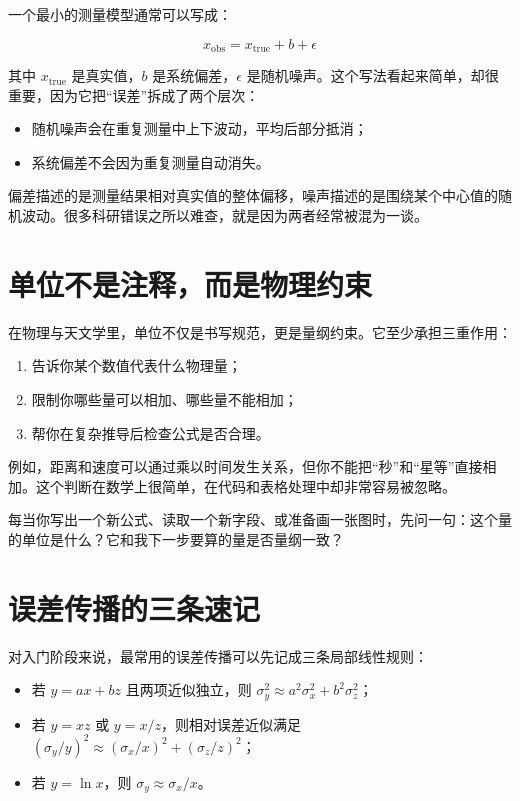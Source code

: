 一个最小的测量模型通常可以写成：

\[
x_{\mathrm{obs}} = x_{\mathrm{true}} + b + \epsilon
\]

其中 $x_{\mathrm{true}}$ 是真实值，$b$ 是系统偏差，$\epsilon$ 是随机噪声。这个写法看起来简单，却很重要，因为它把“误差”拆成了两个层次：

\begin{itemize}
    \item 随机噪声会在重复测量中上下波动，平均后部分抵消；
    \item 系统偏差不会因为重复测量自动消失。
\end{itemize}

\begin{defbox}[偏差与噪声]
偏差描述的是测量结果相对真实值的整体偏移，噪声描述的是围绕某个中心值的随机波动。很多科研错误之所以难查，就是因为两者经常被混为一谈。
\end{defbox}

\section{单位不是注释，而是物理约束}

在物理与天文学里，单位不仅是书写规范，更是量纲约束。它至少承担三重作用：

\begin{enumerate}
    \item 告诉你某个数值代表什么物理量；
    \item 限制你哪些量可以相加、哪些量不能相加；
    \item 帮你在复杂推导后检查公式是否合理。
\end{enumerate}

例如，距离和速度可以通过乘以时间发生关系，但你不能把“秒”和“星等”直接相加。这个判断在数学上很简单，在代码和表格处理中却非常容易被忽略。

\begin{protip}[单位检查是一种低成本高收益习惯]
每当你写出一个新公式、读取一个新字段、或准备画一张图时，先问一句：这个量的单位是什么？它和我下一步要算的量是否量纲一致？
\end{protip}

\section{误差传播的三条速记}

对入门阶段来说，最常用的误差传播可以先记成三条局部线性规则：

\begin{itemize}
    \item 若 $y = a x + b z$ 且两项近似独立，则 $\sigma_y^2 \approx a^2 \sigma_x^2 + b^2 \sigma_z^2$；
    \item 若 $y = xz$ 或 $y = x/z$，则相对误差近似满足 $\left(\sigma_y / y\right)^2 \approx \left(\sigma_x / x\right)^2 + \left(\sigma_z / z\right)^2$；
    \item 若 $y = \ln x$，则 $\sigma_y \approx \sigma_x / x$。
\end{itemize}


